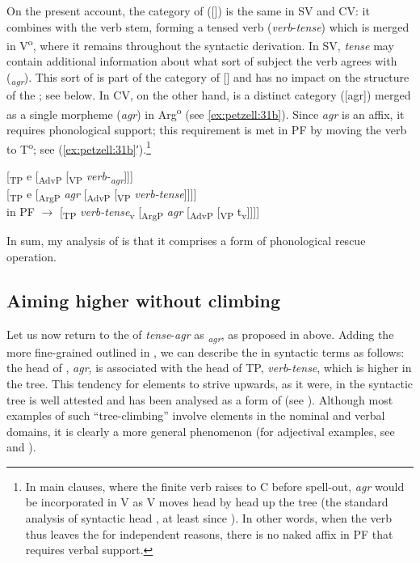 \documentclass[output=paper,colorlinks,citecolor=brown,draft,draftmode]{langscibook}
\begin{document}
On the present account, the category of  ([]) is the same in SV and CV: it combines with the verb stem, forming a tensed verb (\textit{verb}-\textit{tense}) which is merged in V\textsuperscript{o}, where it remains throughout the syntactic derivation. In SV, \textit{tense} may contain additional information about what sort of subject the verb agrees with (\textit{\textsubscript{agr}}). This sort of  is part of the category of [] and has no impact on the structure of the ; see  below. In CV, on the other hand,  is a distinct category ([agr]) merged as a single morpheme (\textit{agr}) in Arg\textsuperscript{o} (see \ref{ex:petzell:31b}). Since \textit{agr} is an affix, it requires phonological support; this requirement is met in PF by moving the verb to T\textsuperscript{o}; see (\ref{ex:petzell:31b}′).\footnote{In
    main clauses, where the finite verb raises to C before spell-out, \textit{agr} would be incorporated in V as V moves head by head up the tree (the standard analysis of syntactic head , at least since \citealt{Chomsky2001}). In other words, when the verb thus leaves the  for independent reasons, there is no naked affix in PF that requires verbal support.
}


\ea\label{ex:petzell:31}
\ea\label{ex:petzell:31a}  [\textsubscript{TP} e [\textsubscript{AdvP} [\textsubscript{VP} \textit{verb-\textsubscript{agr}}]]]\\
\ex\label{ex:petzell:31b}   [\textsubscript{TP} e [\textsubscript{ArgP} \textit{agr} [\textsubscript{AdvP} [\textsubscript{VP} \textit{verb-tense}]]]]  \\
  in PF $\to$ [\textsubscript{TP} \textit{verb-tense}\textsubscript{v} [\textsubscript{ArgP} \textit{agr} [\textsubscript{AdvP} [\textsubscript{VP} t\textsubscript{v}]]]]
\z
\z


In sum, my analysis of  is that it comprises a form of phonological rescue operation.


\subsection{Aiming higher without climbing}\label{sec:petzell:5.2}


Let us now return to the  of \textit{tense}-\textit{agr} as \textit{\textsubscript{agr}}, as proposed in  above. Adding the more fine-grained  outlined in , we can describe the  in syntactic terms as follows: the head of , \textit{agr}, is associated with the head of TP, \textit{verb}-\textit{tense}, which is higher in the tree. This tendency for elements to strive upwards, as it were, in the syntactic tree is well attested and has been analysed as a form of  (see \citealt{RobertsRoussou1999,RobertsRoussou2003}). Although most examples of such “tree-climbing” involve elements in the nominal and verbal domains, it is clearly a more general phenomenon (for adjectival examples, see \citealt{Oxford2017} and ).
\end{document}
